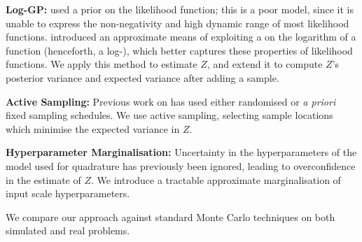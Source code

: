 \documentclass{article} %
\begin{document}



{\bf Log-GP:} \cite{BZMonteCarlo} used a \gpb prior on the likelihood function; this is a poor model, since it is unable to express the non-negativity and high dynamic range of most likelihood functions. \cite{BQR} introduced an approximate means of exploiting a \gpb on the logarithm of a function (henceforth, a log-\gp), which better captures these properties of likelihood functions. We apply this method to estimate $Z$, and extend it to compute $Z$'s posterior variance and expected variance after adding a sample. 

{\bf Active Sampling:} Previous work on  has used either randomised or {\it a priori} fixed sampling schedules. We use active sampling, selecting sample locations which minimise the expected variance in $Z$.


{\bf Hyperparameter Marginalisation:} Uncertainty in the hyperparameters of the model used for quadrature has previously been ignored, leading to overconfidence in the estimate of $Z$.  We introduce a tractable approximate marginalisation of input scale hyperparameters.


We compare our  approach against standard Monte Carlo techniques on both simulated and real problems.
\end{document}
